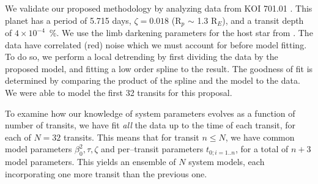\medskip
{\centerline{}}
\smallskip

We validate our proposed methodology by analyzing \kepler data from KOI
701.01 \citep[Kepler 62--b;][]{2013arXiv1304.7387B}.  This planet has
a period of 5.715 days, $\zeta = 0.018$ (R$_p$ $\sim$ 1.3 R$_E$), and
a transit depth of $4 \times 10^{-4}$~\%.  We use the limb darkening
parameters for the host star from
\cite{2010A&A...510A..21S}.  The \kepler data have correlated (red) noise
which we must account for before model fitting.  To do so, we perform
a local detrending by first dividing the data by the proposed model,
and fitting a low order spline to the result.  The goodness of fit is
determined by comparing the product of the spline and the model to the
data.  We were able to model the first 32 transits for this
proposal.



To examine how our knowledge of system parameters evolves as a
function of number of transits, we have fit {\it all} the data up to
the time of each transit, for each of $N = 32$ transits.  This means
that for transit $n \leq N$, we have common model parameters
$\beta_{0}^2, \tau, \zeta$ and per--transit parameters $t_{0;i=1..n}$,
for a total of $n+3$ model parameters.  This yields an ensemble of $N$
system models, each incorporating one more transit than the previous
one.

